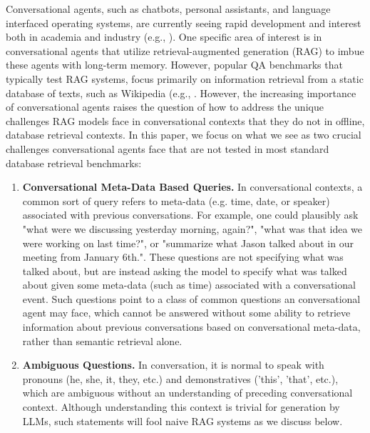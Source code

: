 \documentclass{article}
\begin{document}
Conversational agents, such as chatbots, personal assistants, and language interfaced operating systems, are currently seeing rapid development and interest both in academia and industry (e.g., \cite{jang2023conversation, maharana2024evaluating, zhong2024memorybank, lee2023prompted, lu2023memochat, wu2023brief}). One specific area of interest is in conversational agents that utilize retrieval-augmented generation (RAG) to imbue these agents with long-term memory. However, popular QA benchmarks that typically test RAG systems, focus primarily on information retrieval from a static database of texts, such as Wikipedia (e.g., \cite{kwiatkowski2019natural,yang2018hotpotqa}. However, the increasing importance of conversational agents raises the question of how to address the unique challenges RAG models face in conversational contexts that they do not in offline, database retrieval contexts. In this paper, we focus on what we see as two crucial challenges conversational agents face that are not tested in most standard database retrieval benchmarks:
\begin{enumerate}
  \item \textbf{Conversational Meta-Data Based Queries.} In conversational contexts, a common sort of query refers to meta-data (e.g. time, date, or speaker) associated with previous conversations. For example, one could plausibly ask "what were we discussing yesterday morning, again?", "what was that idea we were working on last time?", or "summarize what Jason talked about in our meeting from January 6th.". These questions are not specifying what was talked about, but are instead asking the model to specify what was talked about given some meta-data (such as time) associated with a conversational event. Such questions point to a class of common questions an conversational agent may face, which cannot be answered without some ability to retrieve information about previous conversations based on conversational meta-data, rather than semantic retrieval alone.
  \item \textbf{Ambiguous Questions. } In conversation, it is normal to speak with pronouns (he, she, it, they, etc.) and demonstratives ('this', 'that', etc.), which are ambiguous without an understanding of preceding conversational context. Although understanding this context is trivial for generation by LLMs, such statements will fool naive RAG systems as we discuss below.
\end{enumerate}
\end{document}
